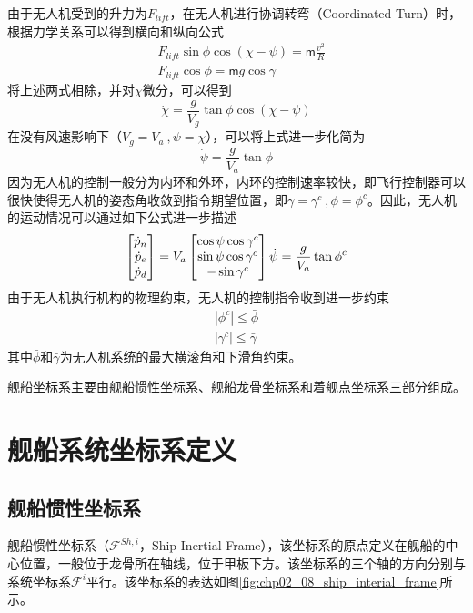 由于无人机受到的升力为$F_{lift}$，在无人机进行协调转弯（Coordinated Turn）时，根据力学关系可以得到横向和纵向公式
\begin{align}
	&F_{lift} \sin \phi \cos (\chi - \psi) = \mathsf{m} \frac{v^2}{R}  \\
	&F_{lift } \cos \phi = \mathsf{m} g \cos \gamma
\end{align}
将上述两式相除，并对$\chi$微分，可以得到
\begin{equation}
	\dot{\chi} = \frac{g}{V_g} \tan \phi \cos (\chi - \psi)
\end{equation}
在没有风速影响下（$V_g = V_a\ , \psi = \chi$），可以将上式进一步化简为
\begin{equation}
	\dot{\psi} =\frac{g}{V_a} \tan \phi
\end{equation}
因为无人机的控制一般分为内环和外环，内环的控制速率较快，即飞行控制器可以很快使得无人机的姿态角收敛到指令期望位置，即$\gamma = \gamma^c\ , \phi = \phi^c$。因此，无人机的运动情况可以通过如下公式进一步描述
\begin{equation}
	\begin{bmatrix} \dot{p}_n \\\dot{p}_e \\ \dot{p}_d \end{bmatrix}  = {V}_a \begin{bmatrix} \cos \psi \cos \gamma^c \\ \sin \psi \cos \gamma^c  \\- \sin \gamma^c \end{bmatrix} \\
	\dot{\psi} =\frac{g}{V_a} \tan \phi^c
\end{equation}
由于无人机执行机构的物理约束，无人机的控制指令收到进一步约束
\begin{align}
	|\phi^c| \le \bar{\phi} \\
	|\gamma^c| \le \bar{\gamma}
\end{align}
其中$\bar{\phi}$和$\bar{\gamma}$为无人机系统的最大横滚角和下滑角约束。



舰船坐标系主要由舰船惯性坐标系、舰船龙骨坐标系和着舰点坐标系三部分组成。
\section{舰船系统坐标系定义}
\subsection{舰船惯性坐标系}
舰船惯性坐标系（$\mathcal{F}^{Sh,i}$，Ship Inertial Frame），该坐标系的原点定义在舰船的中心位置，一般位于龙骨所在轴线，位于甲板下方。该坐标系的三个轴的方向分别与系统坐标系$\mathcal{F}^i$平行。该坐标系的表达如图\ref{fig:chp02_08_ship_interial_frame}所示。

